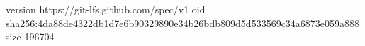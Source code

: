 version https://git-lfs.github.com/spec/v1
oid sha256:4da88de4322db1d7e6b90329890e34b26bdb809d5d533569c34a6873e059a888
size 196704
